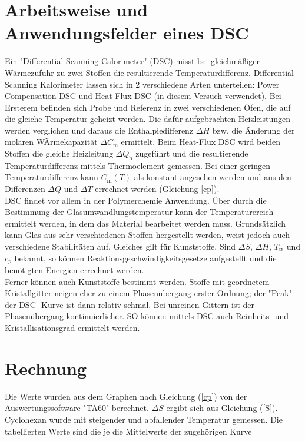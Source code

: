 \documentclass[a4paper,12pt,oneside,onecolum,final,openany]{report}
\begin{document}
\section{Arbeitsweise und Anwendungsfelder eines DSC}
Ein "Differential Scanning Calorimeter" (DSC) misst bei gleichmäßiger Wärmezufuhr zu zwei Stoffen die resultierende Temperaturdifferenz.
Differential Scanning Kalorimeter lassen sich in 2 verschiedene Arten unterteilen: Power Compensation DSC und Heat-Flux DSC (in diesem Versuch verwendet). Bei Ersterem befinden sich Probe und Referenz in zwei verschiedenen Öfen, die auf die gleiche Temperatur geheizt werden. Die dafür aufgebrachten Heizleistungen werden verglichen und daraus die Enthalpiedifferenz $\Delta H$ bzw. die Änderung der molaren WÄrmekapazität $\Delta C_\mathrm{m}$ ermittelt.
Beim Heat-Flux DSC wird beiden Stoffen die gleiche Heizleitung $\Delta Q_\mathrm{h}$ zugeführt und die resultierende Temperaturdifferenz mittels Thermoelement gemessen.
Bei einer geringen Temperaturdifferenz kann $C_\mathrm{m}(T)$ als konstant angesehen werden und aus den Differenzen $\Delta Q$ und $\Delta T$ errechnet werden (Gleichung \ref{cp}).\\

DSC findet vor allem in der Polymerchemie Anwendung. Über durch die Bestimmung der Glasumwandlungstemperatur kann der Temperaturereich ermittelt werden, in dem das Material bearbeitet werden muss. Grundsätzlich kann Glas aus sehr verschiedenen Stoffen hergestellt werden, weist jedoch auch verschiedene Stabilitäten auf. Gleiches gilt für Kunststoffe. 
Sind $\Delta S$, $\Delta H$, $T_\mathrm{tr}$ und $c_p$ bekannt, so können Reaktionsgeschwindigkeitsgesetze aufgestellt und die benötigten Energien errechnet werden.\\ 
Ferner können auch Kunststoffe bestimmt werden.
Stoffe mit geordnetem Kristallgitter neigen eher zu einem Phasenübergang erster Ordnung; der "Peak" der DSC- Kurve ist dann relativ schmal. Bei unreinen Gittern ist der Phasenübergang  kontinuierlicher. SO können mittels DSC auch Reinheits- und Kristallisationsgrad ermittelt werden.\\


\section{Rechnung}

Die Werte wurden aus dem Graphen nach Gleichung (\ref{cp}) von der Auswertungssoftware "TA60" berechnet. 
$\Delta S$ ergibt sich aus Gleichung (\ref{S}). Cyclohexan wurde mit steigender und abfallender Temperatur gemessen. Die tabellierten Werte sind die je die Mittelwerte der zugehörigen Kurve 
\end{document}
